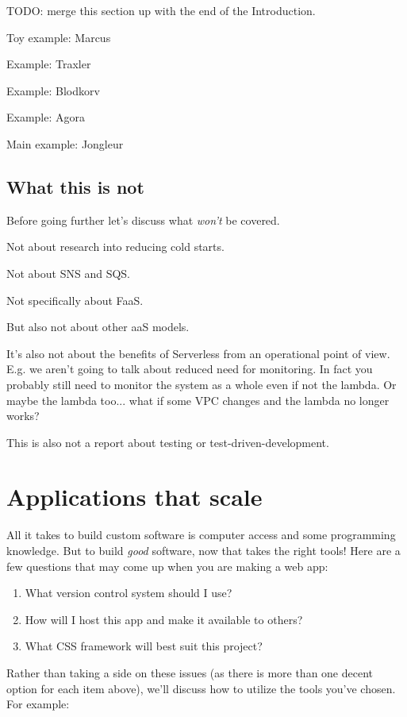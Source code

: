 \documentclass{article}
\begin{document}
TODO: merge this section up with the end of the Introduction.

Toy example: Marcus

Example: Traxler

Example: Blodkorv

Example: Agora

Main example: Jongleur

\subsection{What this is not}

Before going further let's discuss what \textit{won't} be covered.

Not about research into reducing cold starts.

Not about SNS and SQS.

Not specifically about FaaS.

But also not about other aaS models.

It's also not about the benefits of Serverless from an operational point of view.
E.g. we aren't going to talk about reduced need for monitoring.
In fact you probably still need to monitor the system as a whole even if not the lambda.
Or maybe the lambda too... what if some VPC changes and the lambda no longer works?

This is also not a report about testing or test-driven-development.

\section{Applications that scale}

All it takes to build custom software is computer access and some programming knowledge.
But to build \textit{good} software, now that takes the right tools!
Here are a few questions that may come up when you are making a web app:

\begin{enumerate}
  \item What version control system should I use?
  \item How will I host this app and make it available to others?
  \item What CSS framework will best suit this project?
\end{enumerate}

Rather than taking a side on these issues (as there is more than one decent option for each item above), we'll discuss how to utilize the tools you've chosen.
For example:
\end{document}
